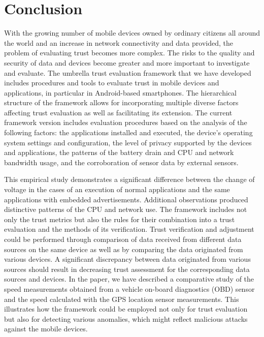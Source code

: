 \section{Conclusion}
With the growing number of mobile devices owned by ordinary citizens all around the world and an increase 
in network connectivity and data provided, the problem of evaluating trust becomes 
more complex.  The risks to
the quality and security of data and devices become greater and more important to investigate and evaluate. The 
umbrella trust evaluation 
framework that we have developed includes procedures and tools to evaluate trust in mobile devices and applications, in particular in Android-based smartphones. 
The  hierarchical structure of the framework allows for incorporating multiple diverse factors affecting trust evaluation as well as facilitating its extension.
The current framework version includes evaluation procedures based on the analysis of the following factors: the applications installed and executed, the device’s operating system settings and configuration, the level of privacy supported by the devices and applications, the patterns of the battery drain and CPU and network bandwidth usage,
and the corroboration of sensor data by external sensors.

This empirical study demonstrates a significant difference between the change of voltage in the cases of an execution 
of normal applications and the same applications with embedded advertisements.  Additional observations produced distinctive patterns of the CPU and network use.
The framework includes not only the trust metrics but also the rules for their combination into a trust
evaluation and the methods of its verification. 
Trust verification and adjustment could be performed through comparison of data received from different data sources on the 
same device as well as by comparing the data originated from various devices. A significant discrepancy between data 
originated from various sources should result in decreasing trust assessment for the corresponding data sources and devices. 
In the paper, we have described a comparative study of the speed measurements obtained from a vehicle on-board diagnostics (OBD)  sensor 
and the speed calculated 
with the GPS location sensor measurements. This illustrates how the framework could be employed not only for trust evaluation 
but also for detecting various anomalies, which might reflect malicious attacks against the mobile devices.
